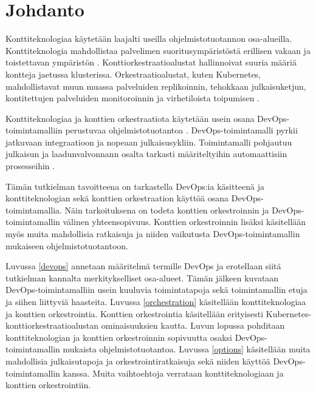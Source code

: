 \chapter{Johdanto\label{intro}}

Konttiteknologiaa käytetään laajalti useilla ohjelmistotuotannon osa-alueilla.
Konttiteknologia mahdollistaa palvelimen suoritusympäristöstä erillisen vakaan ja toistettavan ympäristön \cite{Watada19}.
Konttiorkestraatioalustat hallinnoivat suuria määriä kontteja jaetussa klusterissa.
Orkestraatioalustat, kuten Kubernetes, mahdollistavat muun muassa palveluiden replikoinnin, tehokkaan julkaisuketjun, kontitettujen palveluiden monitoroinnin ja virhetiloista toipumisen \cite{Khan17}.

Konttiteknologiaa ja konttien orkestraatiota käytetään usein osana DevOps-toimintamalliin perustuvaa ohjelmistotuotantoa \cite{Kang16, Narasimhulu23}.
DevOps-toimintamalli pyrkii jatkuvaan integraatioon ja nopeaan julkaisusykliin.
Toimintamalli pohjautuu julkaisun ja laadunvalvonnann osalta tarkasti määriteltyihin automaattisiin prosesseihin \cite{Jabbari16}.

Tämän tutkielman tavoitteena on tarkastella DevOps:ia käsitteenä ja konttiteknologian sekä konttien orkestraation käyttöä osana DevOps-toimintamallia.
Näin tarkoituksena on todeta konttien orkestroinnin ja DevOps-toimintamallin välinen yhteensopivuus.
Konttien orkestroinnin lisäksi käsitellään myös muita mahdollisia ratkaisuja ja niiden vaikutusta DevOps-toimintamallin mukaiseen ohjelmistotuotantoon.

Luvussa \ref{devops} annetaan määritelmä termille DevOps ja erotellaan siitä tutkielman kannalta merkitykselliset osa-alueet.
Tämän jälkeen kuvataan DevOps-toimintamalliin usein kuuluvia toimintatapoja sekä toimintamallin etuja ja siihen liittyviä haasteita.
Luvussa \ref{orchestration} käsitellään konttiteknologiaa ja konttien orkestrointia.
Konttien orkestrointia käsitellään erityisesti Kubernetes-konttiorkestraatioalustan ominaisuuksien kautta.
Luvun lopussa pohditaan konttiteknologian ja konttien orkestroinnin sopivuutta osaksi DevOps-toimintamallin mukaista ohjelmistotuotantoa.
Luvussa \ref{options} käsitellään muita mahdollisia julkaisutapoja ja orkestrointiratkaisuja sekä niiden käyttöä DevOps-toimintamallin kanssa.
Muita vaihtoehtoja verrataan konttiteknologiaan ja konttien orkestrointiin.
